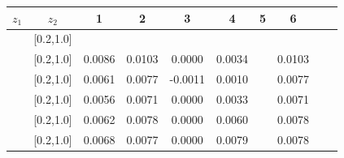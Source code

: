 \begin{table}[H]\scriptsize
\centering
\begin{tabular}{|c| c| c| c| c| c| c| c| c| c|}
\hline
$z_1$ & $z_2$ & 1 & 2 & 3 & 4& 5& 6 \\ \hline
[0.2,0.3]	&	[0.2,1.0]	&		&		&		&		&		&		\\ \hline
[0.3,0.4]	&	[0.2,1.0]	&	0.0086	&	0.0103	&	0.0000	&	0.0034	&		&	0.0103	\\ \hline
[0.4,0.5]	&	[0.2,1.0]	&	0.0061	&	0.0077	&	-0.0011	&	0.0010	&		&	0.0077	\\ \hline
[0.5,0.6]	&	[0.2,1.0]	&	0.0056	&	0.0071	&	0.0000	&	0.0033	&		&	0.0071	\\ \hline
[0.6,0.7]	&	[0.2,1.0]	&	0.0062	&	0.0078	&	0.0000	&	0.0060	&		&	0.0078	\\ \hline
[0.7,1.0]	&	[0.2,1.0]	&	0.0068	&	0.0077	&	0.0000	&	0.0079	&		&	0.0078	\\ \hline
															

\end{tabular}
\end{table}
